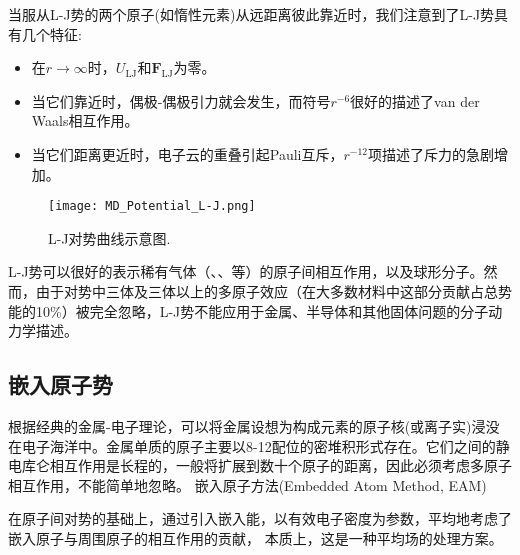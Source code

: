 当服从\textrm{L-J}势的两个原子(如惰性元素)从远距离彼此靠近时，我们注意到了\textrm{L-J}势具有几个特征:~
\begin{itemize}
	\item 在$r\rightarrow\infty$时，$U_{\mathrm{LJ}}$和$\mathbf{F_{\mathrm{LJ}}}$为零。
	\item 当它们靠近时，偶极-偶极引力就会发生，而符号$r^{-6}$很好的描述了\textrm{van der Waals}相互作用。
	\item 当它们距离更近时，电子云的重叠引起\textrm{Pauli}互斥，$r^{-12}$项描述了斥力的急剧增加。
\end{itemize}
\begin{figure}[h!]
\centering
\vspace*{-0.1in}
\texttt{[image: MD\_Potential\_L-J.png]}
\caption{\textrm{L-J}对势曲线示意图.}%
\label{Curve_L-J}
\end{figure}

\textrm{L-J}势可以很好的表示稀有气体（、、等）的原子间相互作用，以及球形分子。然而，由于对势中三体及三体以上的多原子效应（在大多数材料中这部分贡献占总势能的10\%）被完全忽略，\textrm{L-J}势不能应用于金属、半导体和其他固体问题的分子动力学描述。

\subsection{嵌入原子势}
根据经典的金属-电子理论，可以将金属设想为构成元素的原子核(或离子实)浸没在电子海洋中。金属单质的原子主要以8-12配位的密堆积形式存在。它们之间的静电库仑相互作用是长程的，一般将扩展到数十个原子的距离，因此必须考虑多原子相互作用，不能简单地忽略。%
嵌入原子方法\textrm{(Embedded Atom Method, EAM)}%

在原子间对势的基础上，通过引入嵌入能，以有效电子密度为参数，平均地考虑了嵌入原子与周围原子的相互作用的贡献\cite{PRB29-6443_1984,MSR9-251_1993}，%
本质上，这是一种平均场的处理方案。

